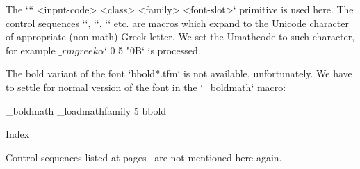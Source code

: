 \begtt \typosize[10/12]
\def\setbbgreekA #1{\Umathcode \_ea`#1 0 5 \tmpnum \advance\tmpnum by1 }
\addto{}
\endtt
%
The \x`\Umathcode`` <input-code> <class> <family> <font-slot>` primitive is used
here. The control sequences `\alpha`, `\beta`, `\gamma` etc. are macros which expand
to the Unicode character of appropriate (non-math) Greek letter. We set the
Umathcode to such character, for example
$\_rmgreek\alpha$` 0 5 "0B` is processed.

The bold variant of the font `bbold*.tfm` is not available, unfortunately.
We have to settle for normal version of the font in the `\_boldmath` macro:

\begtt \typosize[10/12]
   \addto \_boldmath {\_loadmathfamily 5 bbold }
\endtt

\sec Index

Control sequences listed at pages \pgref[listA]--\pgref[listB] are not
mentioned here again.

\makeindex
\endmulti

\bye
